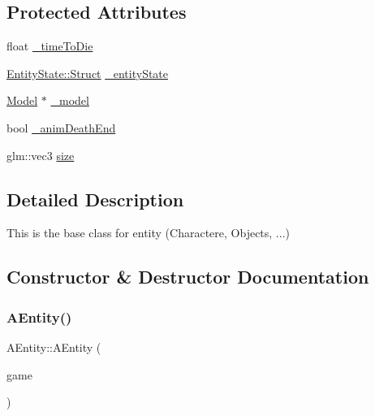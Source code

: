 \subsection*{Protected Attributes}
\begin{DoxyCompactItemize}
\item 
float \hyperlink{class_a_entity_a771c85ac38a97b2d0772d5bbfa3d8776}{\+\_\+time\+To\+Die}
\item 
\hyperlink{struct_entity_state_1_1_struct}{Entity\+State\+::\+Struct} \hyperlink{class_a_entity_a261052ce4fac95fdba699e7ca48d2dd3}{\+\_\+entity\+State}
\item 
\hyperlink{class_model}{Model} $\ast$ \hyperlink{class_a_entity_abd634d5c2a0be6a6627cade7e4e109d0}{\+\_\+model}
\item 
bool \hyperlink{class_a_entity_a465977aaabcdb73a1b48742897348127}{\+\_\+anim\+Death\+End}
\item 
glm\+::vec3 \hyperlink{class_a_entity_a47f976f25e6214669d64fb2bbb2c455a}{size}
\end{DoxyCompactItemize}


\subsection{Detailed Description}
This is the base class for entity (Charactere, Objects, ...) 

\subsection{Constructor \& Destructor Documentation}
\mbox{\label{class_a_entity_ac2e458e7b02ccd083b2e57c0bb27ea24}} 
\subsubsection{\texorpdfstring{A\+Entity()}{AEntity()}\hspace{0.1cm}{\footnotesize\ttfamily [1/2]}}
{\footnotesize\ttfamily A\+Entity\+::\+A\+Entity (\begin{DoxyParamCaption}\item[{\hyperlink{class_scene_game}{Scene\+Game} \&}]{game }\end{DoxyParamCaption})\hspace{0.3cm}{\ttfamily [explicit]}}



